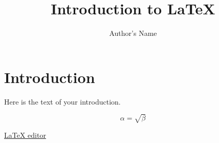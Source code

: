 \documentclass{article}
\begin{document}
\title{Introduction to \LaTeX{}}
\author{Author's Name}

\maketitle

\section{Introduction}
Here is the text of your introduction.

\begin{equation}
    \label{simple_equation}
    \alpha = \sqrt{ \beta }
\end{equation}

\href{https://www.tutorialspoint.com/online_latex_editor.php}{LaTeX editor}
\end{document}
